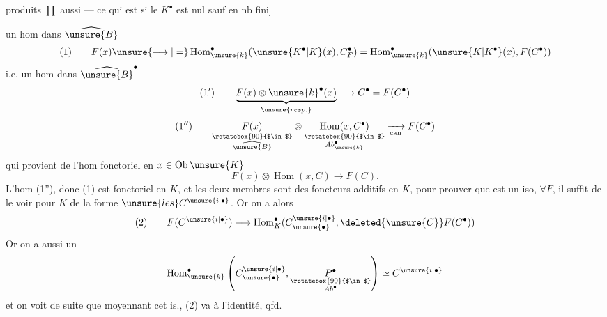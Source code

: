 produits $\prod$ aussi --- ce qui est  si le $K^\bullet$ est nul sauf en nb fini]


 un hom dans $\widehat{\unsure{B}}$
\[
(1)\qquad F(x)\unsure{\longrightarrow|=}\operatorname{Hom}_{\unsure{k}}^\bullet(\unsure{K^\bullet|K}(x),C_F^\bullet)
=\operatorname{Hom}_{\unsure{k}}^\bullet(\unsure{K|K^\bullet}(x),F(C^\bullet))
\]
i.e. un hom dans $\widehat{\unsure{B}}^\bullet$
\[
(1')\qquad \underbrace{F(x)\otimes\unsure{k}^\bullet(x)}_{\unsure{resp.}}\longrightarrow C^\bullet=F(C^\bullet)
\]
\[
(1'')\qquad
\underset{\substack{\rotatebox{90}{$\in$}\\\widehat{\unsure{B}}}}{F(x)}
\otimes\underset{\substack{\rotatebox{90}{$\in$}\\Ab_{\unsure{k}}^\bullet}}{\operatorname{Hom}(x,C^\bullet)}
\xrightarrow[\mathrm{can}]{}F(C^\bullet)
\]
qui provient de l'hom fonctoriel en $x\in\operatorname{Ob}\unsure{K}$
\[
F(x)\otimes\operatorname{Hom}(x,C)\longrightarrow F(C).
\]
L'hom (1''), donc (1) est fonctoriel en $K$,
et les deux membres sont des foncteurs
additifs en $K$, pour prouver que 
est un iso, $\forall F$, il suffit de le voir
pour $K$ de la forme $\unsure{les} C^{\unsure{i|\bullet}}$. Or on a
alors
\[
(2)\qquad F(C^{\unsure{i|\bullet}})\longrightarrow\operatorname{Hom}_{K}^\bullet
(C_{\unsure{\bullet}}^{\unsure{i|\bullet}},\deleted{\unsure{C}}F(C^\bullet))
\]
Or on a aussi un
\[
\operatorname{Hom}_{\unsure{k}}^\bullet
\left(C_{\unsure{\bullet}}^{\unsure{i|\bullet}},\underset{\substack{\rotatebox{90}{$\in$}\\Ab^\bullet}}{P^\bullet}\right)
\simeq C^{\unsure{i|\bullet}}
\]
et on voit de suite que moyennant cet is.,
(2) va à l'identité, qfd.


